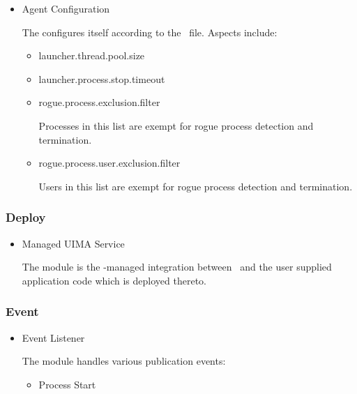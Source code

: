 \begin{itemize}
    \begin{itemize}
      \item Agent Configuration
      
      The \varAgent configures itself according to the 
      \varDuccProperties~file.  Aspects include:
      
      \begin{itemize}
        \item launcher.thread.pool.size
        \item launcher.process.stop.timeout
        \item rogue.process.exclusion.filter
        
        Processes in this list are exempt for rogue process detection
        and termination.
        
        \item rogue.process.user.exclusion.filter
        
        Users in this list are exempt for rogue process detection
        and termination.
        
      \end{itemize} 
      
    \end{itemize}  
            
    \subsubsection{Deploy}
    
    \begin{itemize}
      \item Managed UIMA Service
      
      The module is the \varAgent-managed integration between
      \varUIMAAS~and the user supplied application code which is
      deployed thereto.
      
    \end{itemize}    
    
    \subsubsection{Event}  
    
    \begin{itemize}
      \item Event Listener
      
      The module handles various publication events:
      \begin{itemize}
      \item Process Start 
      

\end{itemize}
\end{itemize}
\end{itemize}
